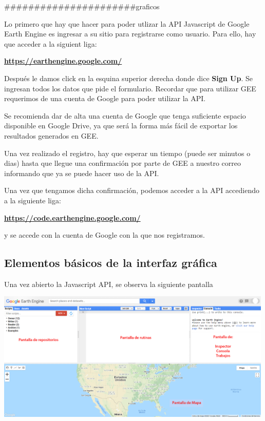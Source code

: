 \documentclass[
]{article}
\begin{document}
\#\#\#\#\#\#\#\#\#\#\#\#\#\#\#\#\#\#\#\#\#\#graficos

Lo primero que hay que hacer para poder utlizar la API Javascript de
Google Earth Engine es ingresar a su sitio para registrarse como
usuario. Para ello, hay que acceder a la siguient liga:

\textbf{\url{https://earthengine.google.com/}}

Después le damos click en la esquina superior derecha donde dice
\textbf{Sign Up}. Se ingresan todos los datos que pide el formulario.
Recordar que para utilizar GEE requerimos de una cuenta de Google para
poder utilizar la API.

\begin{tipblock}
Se recomienda dar de alta una cuenta de Google que tenga suficiente
espacio disponible en Google Drive, ya que será la forma más fácil de
exportar los resultados generados en GEE.

\end{tipblock}

Una vez realizado el registro, hay que esperar un tiempo (puede ser
minutos o dias) hasta que llegue una confirmación por parte de GEE a
nuestro correo informando que ya se puede hacer uso de la API.

Una vez que tengamos dicha confirmación, podemos acceder a la API
accediendo a la siguiente liga:

\textbf{\url{https://code.earthengine.google.com/}}

y se accede con la cuenta de Google con la que nos registramos.

\hypertarget{elementos-buxe1sicos-de-la-interfaz-gruxe1fica}{%
\subsection{Elementos básicos de la interfaz
gráfica}\label{elementos-buxe1sicos-de-la-interfaz-gruxe1fica}}

Una vez abierto la Javascript API, se observa la siguiente pantalla

\includegraphics[width=500px]{Img/GEE_inicio_API}
\end{document}
